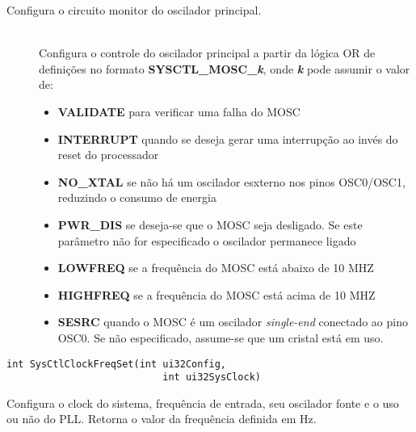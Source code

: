 Configura o circuito monitor do oscilador principal.

\begin{description}
	\item []\hfill \\
	Configura o controle do oscilador principal a partir da lógica OR de definições no formato \textbf{SYSCTL\_MOSC\_\emph{k}}, onde \textbf{\emph{k}} pode assumir o valor de:
	\begin{itemize}
		\item \textbf{VALIDATE} para verificar uma falha do MOSC
		\item \textbf{INTERRUPT} quando se deseja gerar uma interrupção ao invés do reset do processador
		\item \textbf{NO\_XTAL} se não há um oscilador esxterno nos pinos OSC0/OSC1, reduzindo o consumo de energia
		\item \textbf{PWR\_DIS} se deseja-se que o MOSC seja desligado. Se este parâmetro não for especificado o oscilador permanece ligado
		\item \textbf{LOWFREQ} se a frequência do MOSC está abaixo de 10 MHZ
		\item \textbf{HIGHFREQ} se a frequência do MOSC está acima de 10 MHZ
		\item \textbf{SESRC} quando o MOSC é um oscilador \emph{single-end} conectado ao pino OSC0. Se não especificado, assume-se que um cristal está em uso.
	\end{itemize}

\end{description}


\begin{lstlisting}[style=funcao]
	int SysCtlClockFreqSet(int ui32Config,
						   int ui32SysClock)
\end{lstlisting}

Configura o clock do sistema, frequência de entrada, seu oscilador fonte e o uso ou não do PLL. Retorna o valor da frequência definida em Hz.

